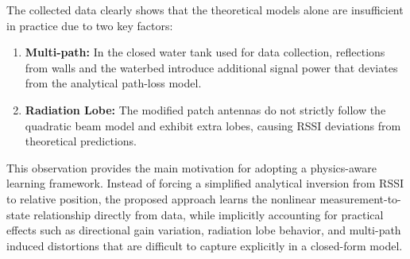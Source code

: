 \documentclass[subscriptcorrection,upint,varvw,barcolor=Goldenrod3,mathalfa=cal=euler,balance,hyphenate,pdf-a]{asmejour}
\begin{document}
The collected data clearly shows that the theoretical models alone are insufficient in practice due to two key factors:
\begin{enumerate}
  \item \textbf{Multi-path:} In the closed water tank used for data collection, reflections from walls and the waterbed introduce additional signal power that deviates from the analytical path-loss model.
  \item \textbf{Radiation Lobe:} The modified patch antennas do not strictly follow the quadratic beam model and exhibit extra lobes, causing RSSI deviations from theoretical predictions.
\end{enumerate}

This observation provides the main motivation for adopting a physics-aware learning framework. Instead of forcing a simplified analytical inversion from RSSI to relative position, the proposed approach learns the nonlinear measurement-to-state relationship directly from data, while implicitly accounting for practical effects such as directional gain variation, radiation lobe behavior, and multi-path induced distortions that are difficult to capture explicitly in a closed-form model.
\end{document}
